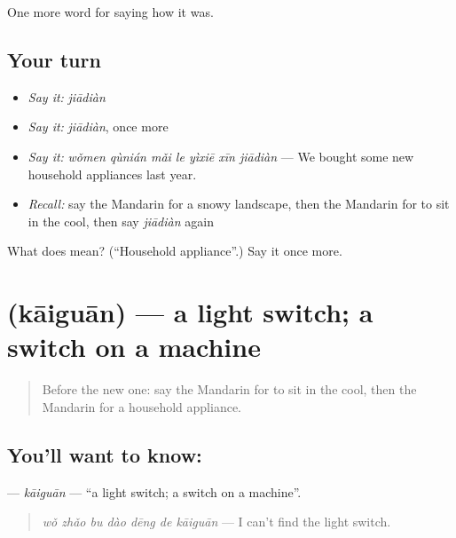 \begin{grammarlens}[title={What you've built}]
One more word for saying how it was.
\end{grammarlens}

\subsection*{Your turn}
\begin{itemize}
\raggedright
  \item \emph{Say it:} \emph{jiādiàn}
  \item \emph{Say it:} \emph{jiādiàn}, once more
  \item \emph{Say it:} \emph{wǒmen qùnián mǎi le yìxiē xīn jiādiàn} — We bought some new household appliances last year.
  \item \emph{Recall:} say the Mandarin for a snowy landscape, then the Mandarin for to sit in the cool, then say \emph{jiādiàn} again
\end{itemize}

\begin{tcolorbox}[breakable,colback=teal!4,colframe=teal!35!black,title={Before you move on}]
What does  mean? (\textquotedblleft{}Household appliance\textquotedblright{}.) Say it once more.
\end{tcolorbox}
\section[\texorpdfstring{\zh{开关} (kāiguān)}{开关 (kāiguān)}]{ (kāiguān) — a light switch; a switch on a machine}

\label{lesson:ZH-C520-kaiguan}



\begin{quote}
Before the new one: say the Mandarin for to sit in the cool, then the Mandarin for a household appliance.
\end{quote}

\subsection*{You'll want to know: }
\textbf{} — \emph{kāiguān} — \textquotedblleft{}a light switch; a switch on a machine\textquotedblright{}.

\begin{quote}
\emph{wǒ zhǎo bu dào dēng de kāiguān} — I can't find the light switch.
\end{quote}

